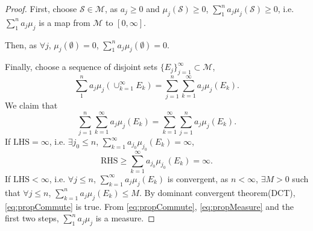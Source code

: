 \documentclass{article}
\begin{document}
\begin{proof}
    First, choose $\mathcal{S}\in\mathcal{M}$, 
    as $a_{j}\ge 0$ and $\mu_{j}(\mathcal{S})\ge 0$, 
    $\sum_{1}^{n}a_{j}\mu_{j}(\mathcal{S})\ge 0$, 
    i.e. $\sum_{1}^{n}a_{j}\mu_{j}$ is a map from $\mathcal{M}$ to 
    $[0,\infty]$.

    Then, as $\forall j$, $\mu_{j}(\emptyset)=0$, 
    $\sum_{1}^{n}a_{j}\mu_{j}(\emptyset)=0$.

    Finally, choose a sequence of disjoint sets 
    $\{E_{j}\}_{j=1}^{\infty}\subset\mathcal{M}$, 
    \begin{equation}
        \label{eq:propMeasure}
        \sum_{1}^{n}a_{j}\mu_{j}(\cup_{k=1}^{\infty}E_{k})
        =\sum_{j=1}^{n}\sum_{k=1}^{\infty}a_{j}\mu_{j}(E_{k}).
    \end{equation}
    We claim that 
    \begin{equation}
        \label{eq:propCommute}
        \sum_{j=1}^{n}\sum_{k=1}^{\infty}a_{j}\mu_{j}(E_{k})
        =\sum_{k=1}^{\infty}\sum_{j=1}^{n}a_{j}\mu_{j}(E_{k}).
    \end{equation}
    If $\text{LHS}=\infty$, i.e. $\exists j_{0}\le n$, 
    $\sum_{k=1}^{\infty}a_{j_0}\mu_{j_0}(E_{k})=\infty$, 
    \begin{displaymath}
        \text{RHS}\ge\sum_{k=1}^{\infty}a_{j_{0}}\mu_{j_{0}}(E_{k})
        =\infty.
    \end{displaymath}
    If $\text{LHS}<\infty$, 
    i.e. $\forall j\le n$, $\sum_{k=1}^{\infty}a_{j}\mu_{j}(E_{k})$ 
    is convergent, 
    as $n<\infty$, $\exists M>0$ 
    such that $\forall j\le n$, 
    $\sum_{k=1}^{n}a_{j}\mu_{j}(E_{k})\le M$. 
    By dominant convergent theorem(DCT), \eqref{eq:propCommute} is true. 
    From \eqref{eq:propCommute}, \eqref{eq:propMeasure} and the first two steps, 
    $\sum_{1}^{n}a_{j}\mu_{j}$ is a measure.
\end{proof}
\end{document}
